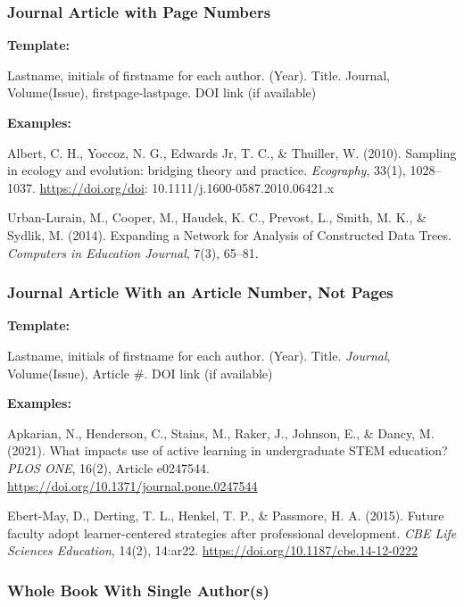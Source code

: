 \documentclass[
]{book}
\begin{document}
\hypertarget{journal-article-with-page-numbers}{%
\subsubsection{Journal Article with Page Numbers}\label{journal-article-with-page-numbers}}

\textbf{Template:}

Lastname, initials of firstname for each author. (Year). Title. Journal, Volume(Issue), firstpage-lastpage. DOI link (if available)

\textbf{Examples:}

Albert, C. H., Yoccoz, N. G., Edwards Jr, T. C., \& Thuiller, W. (2010). Sampling in ecology and evolution: bridging theory and practice. \emph{Ecography}, 33(1), 1028--1037. \url{https://doi.org/doi}: 10.1111/j.1600-0587.2010.06421.x

Urban-Lurain, M., Cooper, M., Haudek, K. C., Prevost, L., Smith, M. K., \& Sydlik, M. (2014). Expanding a Network for Analysis of Constructed Data Trees. \emph{Computers in Education Journal}, 7(3), 65--81.

\hypertarget{journal-article-with-an-article-number-not-pages}{%
\subsubsection{Journal Article With an Article Number, Not Pages}\label{journal-article-with-an-article-number-not-pages}}

\textbf{Template:}

Lastname, initials of firstname for each author. (Year). Title. \emph{Journal}, Volume(Issue), Article \#. DOI link (if available)

\textbf{Examples:}

Apkarian, N., Henderson, C., Stains, M., Raker, J., Johnson, E., \& Dancy, M. (2021). What impacts use of active learning in undergraduate STEM education? \emph{PLOS ONE}, 16(2), Article e0247544. \url{https://doi.org/10.1371/journal.pone.0247544}

Ebert-May, D., Derting, T. L., Henkel, T. P., \& Passmore, H. A. (2015). Future faculty adopt learner-centered strategies after professional development. \emph{CBE Life Sciences Education}, 14(2), 14:ar22. \url{https://doi.org/10.1187/cbe.14-12-0222}

\hypertarget{whole-book-with-single-authors}{%
\subsubsection{Whole Book With Single Author(s)}\label{whole-book-with-single-authors}}
\end{document}
